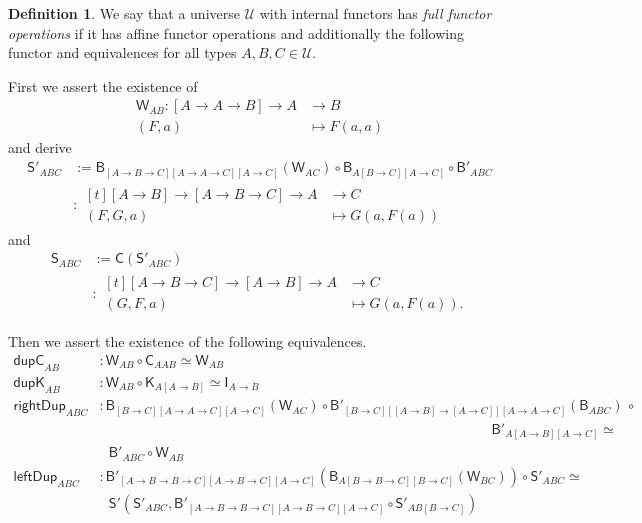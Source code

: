 \documentclass[a4paper]{article}
\theoremstyle{definition}
\newtheorem{definition}{Definition}[section]
\theoremstyle{remark}
\newcommand{\defn}{\emph}
\renewcommand{\equiv}{\simeq}
\newcommand{\U}{\mathcal{U}}
\newcommand{\nm}{\mathsf}
\newcommand{\combinator}{\nm}
\newcommand{\idFun}{\combinator{I}}
\newcommand{\constFun}{\combinator{K}}
\newcommand{\compFun}{\combinator{B'}}
\newcommand{\revCompFun}{\combinator{B}}
\newcommand{\swapFun}{\combinator{C}}
\newcommand{\dupFun}{\combinator{W}}
\newcommand{\substFun}{\combinator{S'}}
\newcommand{\revSubstFun}{\combinator{S}}
\begin{document}
\begin{definition}
  We say that a universe $\U$ with internal functors has \defn{full functor
  operations} if it has affine functor operations and additionally the following functor
  and equivalences for all types $A,B,C \in \U.$

  First we assert the existence of
  \begin{align*}
    \dupFun_{AB} : [A \to A \to B] \to A &\to     B\\
                   (F,a)                 &\mapsto F(a,a)
  \end{align*}
  and derive
  \begin{align*}
    \substFun_{ABC} &:= \revCompFun_{[A{\to}B{\to}C][A{\to}A{\to}C][A{\to}C]}(\dupFun_{AC}) \circ
                        \revCompFun_{A[B{\to}C][A{\to}C]} \circ
                        \compFun_{ABC}\\
                    &: \begin{aligned}[t]
                         [A \to B] \to [A \to B \to C] \to A &\to     C\\
                         (F,G,a)                             &\mapsto G(a,F(a))
                       \end{aligned}
  \end{align*}
  and
  \begin{align*}
    \revSubstFun_{ABC} &:= \swapFun(\substFun_{ABC})\\
                       &: \begin{aligned}[t]
                            [A \to B \to C] \to [A \to B] \to A &\to     C\\
                            (G,F,a)                             &\mapsto G(a,F(a)).
                          \end{aligned}
  \end{align*}

  Then we assert the existence of the following equivalences.
  \begin{align*}
    \nm{dupC}_{AB}      &: \dupFun_{AB} \circ \swapFun_{AAB} \equiv \dupFun_{AB}\\
    \nm{dupK}_{AB}      &: \dupFun_{AB} \circ \constFun_{A[A{\to}B]} \equiv \idFun_{A{\to}B}\\
    \nm{rightDup}_{ABC} &: \revCompFun_{[B{\to}C][A{\to}A{\to}C][A{\to}C]}(\dupFun_{AC}) \circ \compFun_{[B{\to}C][[A{\to}B]{\to}[A{\to}C]][A{\to}A{\to}C]}(\revCompFun_{ABC})\,\circ\\
                        &\hspace{28em}\compFun_{A[A{\to}B][A{\to}C]} \equiv\\
                        &\:\ \ \compFun_{ABC} \circ \dupFun_{AB}\\
    \nm{leftDup}_{ABC}  &: \compFun_{[A{\to}B{\to}B{\to}C][A{\to}B{\to}C][A{\to}C]}(\revCompFun_{A[B{\to}B{\to}C][B{\to}C]}(\dupFun_{BC})) \circ \substFun_{ABC} \equiv\\
                        &\:\ \ \substFun(\substFun_{ABC},\compFun_{[A{\to}B{\to}B{\to}C][A{\to}B{\to}C][A{\to}C]} \circ \substFun_{AB[B{\to}C]})
  \end{align*}
\end{definition}
\end{document}
